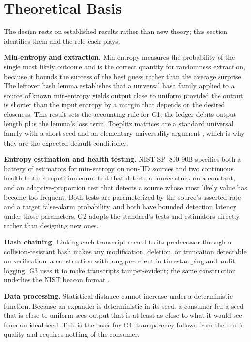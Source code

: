 \section{Theoretical Basis}
 
The design rests on established results rather than new theory; this section identifies
them and the role each plays.
 
\textbf{Min-entropy and extraction.} Min-entropy measures the probability of the single
most likely outcome and is the correct quantity for randomness extraction, because it
bounds the success of the best guess rather than the average surprise. The leftover
hash lemma \citep{impagliazzo1989,hastad1999} establishes that a universal hash family
applied to a source of known min-entropy yields output close to uniform provided the
output is shorter than the input entropy by a margin that depends on the desired
closeness. This result sets the accounting rule for G1: the ledger debits output length
plus the lemma's loss term. Toeplitz matrices are a standard universal family with a
short seed and an elementary universality argument \citep{krawczyk1994}, which is why
they are the expected default conditioner.
 
\textbf{Entropy estimation and health testing.} NIST SP~800-90B \citep{turan2018}
specifies both a battery of estimators for min-entropy on non-IID sources and two
continuous health tests: a repetition-count test that detects a source stuck on a
constant, and an adaptive-proportion test that detects a source whose most likely value
has become too frequent. Both tests are parameterized by the source's asserted rate and
a target false-alarm probability, and both have bounded detection latency under those
parameters. G2 adopts the standard's tests and estimators directly rather than
designing new ones.
 
\textbf{Hash chaining.} Linking each transcript record to its predecessor through a
collision-resistant hash makes any modification, deletion, or truncation detectable on
verification, a construction with long precedent in timestamping and audit logging.
G3 uses it to make transcripts tamper-evident; the same construction underlies the
NIST beacon format \citep{kelsey2019}.
 
\textbf{Data processing.} Statistical distance cannot increase under a deterministic
function. Because an expander is deterministic in its seed, a consumer fed a seed that
is close to uniform sees output that is at least as close to what it would see from an
ideal seed. This is the basis for G4: transparency follows from the seed's quality and
requires nothing of the consumer.
